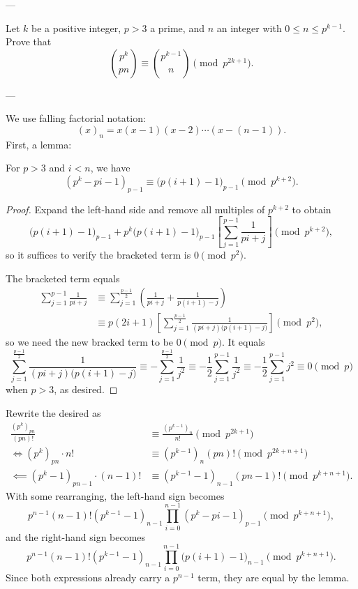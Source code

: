
---

Let $k$ be a positive integer, $p>3$ a prime, and $n$ an integer with $0\le n\le p^{k-1}$. Prove that \[\binom{p^k}{pn}\equiv\binom{p^{k-1}}n\pmod{p^{2k+1}}.\]

---

We use falling factorial notation: \[(x)_n=x(x-1)(x-2)\cdots(x-(n-1)).\]
First, a lemma:
\begin{boxlemma*}
    For $p>3$ and $i<n$, we have \[\left(p^k-pi-1\right)_{p-1}\equiv\big(p(i+1)-1\big)_{p-1}\pmod{p^{k+2}}.\]
\end{boxlemma*}
\begin{proof}
    Expand the left-hand side and remove all multiples of $p^{k+2}$ to obtain \[\big(p(i+1)-1\big)_{p-1}+p^k\big(p(i+1)-1\big)_{p-1}\left[\sum_{j=1}^{p-1}\frac1{pi+j}\right]\pmod{p^{k+2}},\]
    so it suffices to verify the bracketed term is $0\pmod{p^2}$.

    The bracketed term equals
    \begin{align*}
        \sum_{j=1}^{p-1}\frac1{pi+j}&\equiv\sum_{j=1}^{\frac{p-1}2}\left(\frac1{pi+j}+\frac1{p(i+1)-j}\right)\\
        &\equiv p(2i+1)\left[\sum_{j=1}^{\frac{p-1}2}\frac1{(pi+j)\big(p(i+1)-j\big)}\right]\pmod{p^2},
    \end{align*}
    so we need the new bracked term to be $0\pmod p$. It equals \[\sum_{j=1}^{\frac{p-1}2}\frac1{(pi+j)\big(p(i+1)-j\big)}\equiv-\sum_{j=1}^{\frac{p-1}2}\frac1{j^2}\equiv-\frac12\sum_{j=1}^{p-1}\frac1{j^2}\equiv-\frac12\sum_{j=1}^{p-1}j^2\equiv0\pmod p\]
    when $p>3$, as desired.
\end{proof}

Rewrite the desired as
\begin{align*}
    \frac{\left(p^k\right)_{pn}}{(pn)!}&\equiv\frac{\left(p^{k-1}\right)_n}{n!}\pmod{p^{2k+1}}\\
    \iff\left(p^k\right)_{pn}\cdot n!&\equiv\left(p^{k-1}\right)_n(pn)!\pmod{p^{2k+n+1}}\\
        \impliedby\left(p^k-1\right)_{pn-1}\cdot(n-1)!&\equiv\left(p^{k-1}-1\right)_{n-1}(pn-1)!\pmod{p^{k+n+1}}.
\end{align*}
With some rearranging, the left-hand sign becomes \[p^{n-1}(n-1)!\left(p^{k-1}-1\right)_{n-1}\prod_{i=0}^{n-1}\left(p^k-pi-1\right)_{p-1}\pmod{p^{k+n+1}},\]
and the right-hand sign becomes \[p^{n-1}(n-1)!\left(p^{k-1}-1\right)_{n-1}\prod_{i=0}^{n-1}\big(p(i+1)-1\big)_{n-1}\pmod{p^{k+n+1}}.\]
Since both expressions already carry a $p^{n-1}$ term, they are equal by the lemma.

